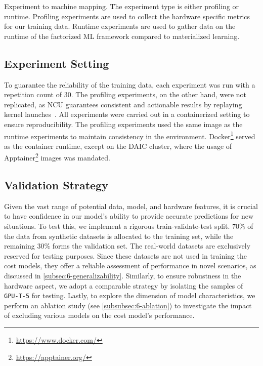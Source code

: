 \begin{table}[ht]
  \centering
  
  \caption[Experiment to machine mapping]{Experiment to machine mapping. The experiment type is either profiling or runtime. Profiling experiments are used to collect the hardware specific metrics for our training data. Runtime experiments are used to gather data on the runtime of the factorized ML framework compared to materialized learning.}
  \label{tab:6-hardware-overview}
\end{table}

\subsection{Experiment Setting}
To guarantee the reliability of the training data, each experiment was run with a repetition count of $30$. The profiling experiments, on the other hand, were not replicated, as NCU guarantees consistent and actionable results by replaying kernel launches~\cite{nsight_compute}. All experiments were carried out in a containerized setting to ensure reproducibility. The profiling experiments used the same image as the runtime experiments to maintain consistency in the environment. Docker\footnote{\url{https://www.docker.com/}} served as the container runtime, except on the DAIC cluster, where the usage of Apptainer\footnote{\url{https://apptainer.org/}} images was mandated.

\subsection{Validation Strategy}
\label{subsec:6-validation-strategy}
Given the vast range of potential data, model, and hardware features, it is crucial to have confidence in our model's ability to provide accurate predictions for new situations. To test this, we implement a rigorous train-validate-test split. $70\%$ of the data from synthetic datasets is allocated to the training set, while the remaining $30\%$ forms the validation set. The real-world datasets are exclusively reserved for testing purposes. Since these datasets are not used in training the cost models, they offer a reliable assessment of performance in novel scenarios, as discussed in \autoref{subsec:6-generalizability}. Similarly, to ensure robustness in the hardware aspect, we adopt a comparable strategy by isolating the samples of \texttt{GPU-T-5} for testing. Lastly, to explore the dimension of model characteristics, we perform an ablation study (see \autoref{subsubsec:6-ablation}) to investigate the impact of excluding various models on the cost model's performance.

